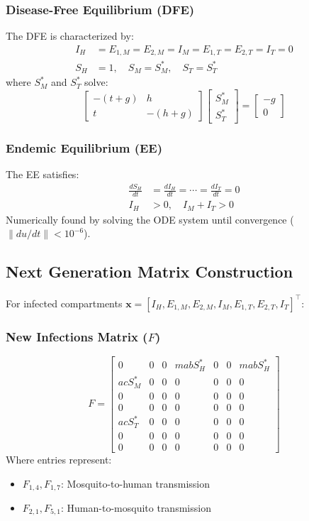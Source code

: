 \documentclass{article}
\begin{document}
\subsubsection{Disease-Free Equilibrium (DFE)}
The DFE is characterized by:
\begin{align*}
    I_H &= E_{1,M} = E_{2,M} = I_M = E_{1,T} = E_{2,T} = I_T = 0 \\
    S_H &= 1,\quad S_M = S_M^*,\quad S_T = S_T^*
\end{align*}
where $S_M^*$ and $S_T^*$ solve:
\begin{equation*}
    \begin{bmatrix}
        -(t + g) & h \\
        t & -(h + g)
    \end{bmatrix}
    \begin{bmatrix}
        S_M^* \\
        S_T^*
    \end{bmatrix}
    =
    \begin{bmatrix}
        -g \\
        0
    \end{bmatrix}
\end{equation*}

\subsubsection{Endemic Equilibrium (EE)}
The EE satisfies:
\begin{align*}
    \frac{dS_H}{dt} &= \frac{dI_H}{dt} = \cdots = \frac{dI_T}{dt} = 0 \\
    I_H &> 0,\quad I_M + I_T > 0
\end{align*}
Numerically found by solving the ODE system until convergence ($\|du/dt\| < 10^{-6}$).

\subsection{Next Generation Matrix Construction}
For infected compartments $\mathbf{x} = [I_H, E_{1,M}, E_{2,M}, I_M, E_{1,T}, E_{2,T}, I_T]^\top$:

\subsubsection{New Infections Matrix ($F$)}
\[
F = \begin{bmatrix}
0 & 0 & 0 & mabS_H^* & 0 & 0 & mabS_H^* \\
acS_M^* & 0 & 0 & 0 & 0 & 0 & 0 \\
0 & 0 & 0 & 0 & 0 & 0 & 0 \\
0 & 0 & 0 & 0 & 0 & 0 & 0 \\
acS_T^* & 0 & 0 & 0 & 0 & 0 & 0 \\
0 & 0 & 0 & 0 & 0 & 0 & 0 \\
0 & 0 & 0 & 0 & 0 & 0 & 0
\end{bmatrix}
\]
Where entries represent:
\begin{itemize}
    \item $F_{1,4}, F_{1,7}$: Mosquito-to-human transmission
    \item $F_{2,1}, F_{5,1}$: Human-to-mosquito transmission
\end{itemize}
\end{document}
